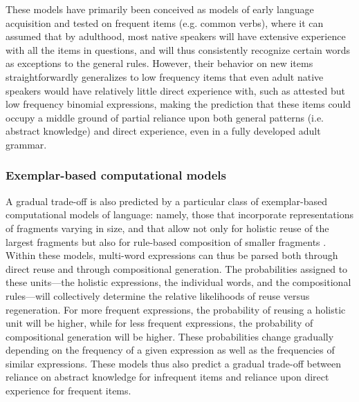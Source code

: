 \documentclass[authoryear]{elsarticle}
\begin{document}
These models have primarily been conceived as models of early language acquisition and tested on frequent items (e.g. common verbs), where it can assumed that by adulthood, most native speakers will have extensive experience with all the items in questions, and will thus consistently recognize certain words as exceptions to the general rules. However, their behavior on new items straightforwardly generalizes to low frequency items that even adult native speakers would have relatively little direct experience with, such as attested but low frequency binomial expressions, making the prediction that these items could occupy a middle ground of partial reliance upon both general patterns (i.e. abstract knowledge) and direct experience, even in a fully developed adult grammar.


\subsubsection{Exemplar-based computational models}
A gradual trade-off is also predicted by a particular class of exemplar-based computational models of language: namely, those that incorporate representations of fragments varying in size, and that allow not only for holistic reuse of the largest fragments but also for rule-based composition of smaller fragments \citep[e.g.][]{Bod:1998tx,Bod:2003uw, Bod:2008uc, Johnson:2007wl, Demberg:2010tf, ODonnell:2011vh}. Within these models, multi-word expressions can thus be parsed both through direct reuse and through compositional generation. The probabilities assigned to these units---the holistic expressions, the individual words, and the compositional rules---will collectively determine the relative likelihoods of reuse versus regeneration. For more frequent expressions, the probability of reusing a holistic unit will be higher, while for less frequent expressions, the probability of compositional generation will be higher. These probabilities change gradually depending on the frequency of a given expression as well as the frequencies of similar expressions. These models thus also predict a gradual trade-off between reliance on abstract knowledge for infrequent items and reliance upon direct experience for frequent items.
\end{document}
